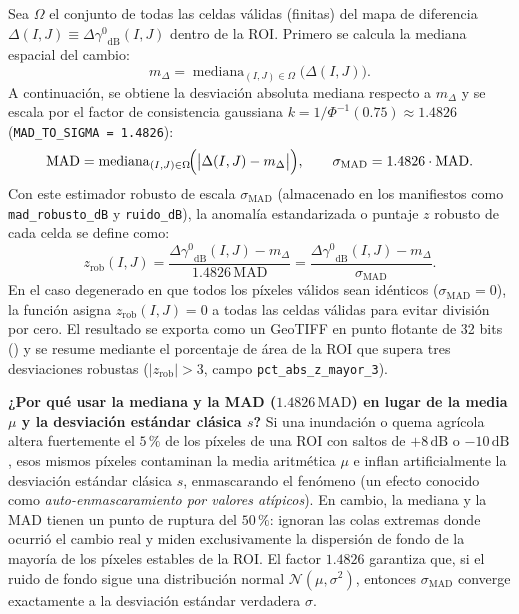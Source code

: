 \documentclass[11pt,a4paper]{article}
\newcommand{\unit}[1]{\mathrm{#1}}
\newcommand{\gz}{\ensuremath{\gamma^{0}}}
\begin{document}
Sea $\Omega$ el conjunto de todas las celdas válidas (finitas) del mapa de diferencia $\Delta(I,J) \equiv
\Delta\gz_{\mathrm{dB}}(I,J)$ dentro de la ROI. Primero se calcula la mediana espacial del cambio:
\begin{equation}
  m_{\Delta} = \operatorname{mediana}_{(I,J)\in\Omega}\!\bigl(\Delta(I,J)\bigr).
  \label{eq:cambio-mediana}
\end{equation}
A continuación, se obtiene la desviación absoluta mediana respecto a $m_{\Delta}$ y se escala por el factor de
consistencia gaussiana $k = 1 / \Phi^{-1}(0.75) \approx 1.4826$ (\texttt{MAD\_TO\_SIGMA = 1.4826}):
\begin{equation}
  \mathrm{MAD} = \operatorname{mediana}_{(I,J)\in\Omega}\!\Bigl(\bigl|\Delta(I,J) - m_{\Delta}\bigr|\Bigr),
  \qquad
  \sigma_{\mathrm{MAD}} = 1.4826 \cdot \mathrm{MAD}.
  \label{eq:cambio-mad-sigma}
\end{equation}
Con este estimador robusto de escala $\sigma_{\mathrm{MAD}}$ (almacenado en los manifiestos como
\texttt{mad\_robusto\_dB} y \texttt{ruido\_dB}), la anomalía estandarizada o puntaje $z$ robusto de cada celda
se define como:
\begin{equation}
  z_{\mathrm{rob}}(I,J) = \frac{\Delta\gz_{\mathrm{dB}}(I,J) - m_{\Delta}}{1.4826\,\mathrm{MAD}}
  = \frac{\Delta\gz_{\mathrm{dB}}(I,J) - m_{\Delta}}{\sigma_{\mathrm{MAD}}}.
  \label{eq:cambio-z-robusto}
\end{equation}
En el caso degenerado en que todos los píxeles válidos sean idénticos ($\sigma_{\mathrm{MAD}} = 0$), la función
asigna $z_{\mathrm{rob}}(I,J) = 0$ a todas las celdas válidas para evitar división por cero. El resultado se
exporta como un GeoTIFF en punto flotante de 32 bits () y se resume mediante el
porcentaje de área de la ROI que supera tres desviaciones robustas ($|z_{\mathrm{rob}}| > 3$, campo
\texttt{pct\_abs\_z\_mayor\_3}).

\begin{intuicion}
\textbf{¿Por qué usar la mediana y la MAD ($1.4826\,\mathrm{MAD}$) en lugar de la media $\mu$ y la desviación
estándar clásica $s$?}
Si una inundación o quema agrícola altera fuertemente el $5\,\text{\%}$ de los píxeles de una ROI con saltos de
$+8\,\unit{dB}$ o $-10\,\unit{dB}$, esos mismos píxeles contaminan la media aritmética $\mu$ e inflan
artificialmente la desviación estándar clásica $s$, enmascarando el fenómeno (un efecto conocido como
\emph{auto-enmascaramiento por valores atípicos}). En cambio, la mediana y la MAD tienen un punto de ruptura
del $50\,\text{\%}$: ignoran las colas extremas donde ocurrió el cambio real y miden exclusivamente la dispersión de
fondo de la mayoría de los píxeles estables de la ROI. El factor $1.4826$ garantiza que, si el ruido de fondo
sigue una distribución normal $\mathcal{N}(\mu, \sigma^2)$, entonces $\sigma_{\mathrm{MAD}}$ converge exactamente
a la desviación estándar verdadera $\sigma$.
\end{intuicion}
\end{document}

